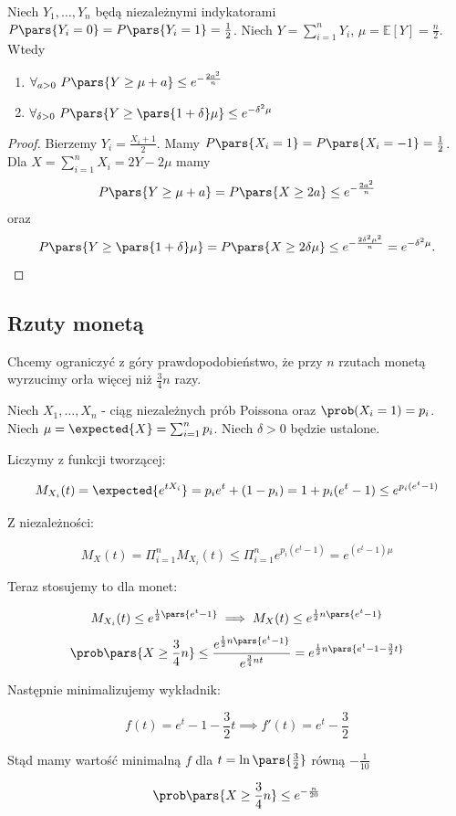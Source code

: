 \begin{theorem}
	Niech \(Y_1,\ldots,Y_n\) będą niezależnymi indykatorami \(P \pars{ Y_i = 0 } = P \pars{ Y_i = 1 } = \frac{1}{2}\). Niech \(Y = \sum_{i=1}^{n} Y_i\), \(\mu = \mathbb{E}\left[ Y \right] = \frac{n}{2}\). Wtedy
	\begin{enumerate}
		\item \(\forall_{a>0} \ P \pars{ Y \ge \mu+a } \le e^{-\frac{2a^2}{n}} \)
		\item \(\forall_{\delta > 0} \   P \pars{ Y \ge \pars{ 1+\delta } \mu } \le e ^{-\delta^2\mu}\)
	\end{enumerate}
\end{theorem}
\begin{proof}
	Bierzemy \(Y_i = \frac{X_i + 1}{2}\). Mamy \(P \pars{ X_i = 1 } = P \pars{ X_i = -1 } = \frac{1}{2}\). Dla  \(X = \sum_{i=1}^{n} X_i = 2Y-2\mu\) mamy \[ P \pars{ Y \ge \mu+a } = P \pars{ X \ge 2a } \le e^{-\frac{2a^2}{n}}  \]
	oraz \[ P \pars{ Y \ge \pars{ 1+\delta } \mu } = P \pars{ X \ge 2\delta\mu } \le e^{- \frac{2\delta^2\mu^2}{n}} = e^{-\delta^2\mu}. \]
\end{proof}

\subsection{Rzuty monetą}
\begin{example}
	\label{chernoff-coin-tosses}
    Chcemy ograniczyć z góry prawdopodobieństwo, że przy \(n\) rzutach monetą wyrzucimy orła więcej niż \( \frac{3}{4} n \) razy.%

    Niech \( X_1, \ldots, X_n \) - ciąg niezależnych prób Poissona oraz \( \prob(X_i = 1) = p_i \). Niech \( \mu = \expected{X} = \sum_{i=1}^{n} p_i \). Niech \( \delta > 0 \) będzie ustalone.

    Liczymy z funkcji tworzącej:

    \[
        M_{X_i}(t) = \expected{e^{tX_i}} = p_ie^t + (1 - p_i) = 1 + p_i(e^t - 1) \leq e^{p_i(e^t-1)}
    \]

    Z niezależności:

    \[
        M_X(t) = \Pi_{i=1}^n M_{X_i}(t) \leq \Pi_{i=1}^n e^{p_i(e^t - 1)} = e^{(e^t - 1)\mu}
    \]

    Teraz stosujemy to dla monet:

    \[
        M_{X_i}(t) \leq e^{\frac{1}{2} \pars{ e^t - 1 }} \implies M_X(t) \leq e^{\frac{1}{2} n \pars{ e^t - 1 }}
    \]
    \[
        \prob\pars{ X \geq \frac{3}{4}n } \leq 
        \frac{e^{\frac{1}{2} n \pars{ e^t - 1 }}}{e^{\frac{3}{4} nt}} = e^{\frac{1}{2} n \pars{ e^t - 1 - \frac{3}{2} t }}
    \]

    Następnie minimalizujemy wykładnik:

    \[
        f(t) = e^t - 1 - \frac{3}{2}t \implies f'(t) = e^t - \frac{3}{2}
    \]

    Stąd mamy wartość minimalną \( f \) dla \( t = \ln\pars{\frac{3}{2}} \) równą \( -\frac{1}{10} \)

    \[
        \prob\pars{ X \geq \frac{3}{4}n } \leq e^{-\frac{n}{20}}
    \]
\end{example}

